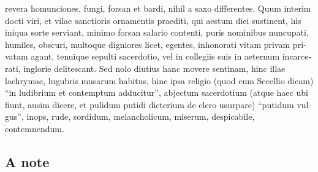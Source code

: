 \begin{latin}
revera homunciones, fungi, forsan et bardi, nihil a saxo differentes. Quum
interim docti viri, et vilae sanctioris ornamentis praediti, qui aestum diei
sustinent, his iniqua sorte serviant, minimo forsan salario contenti, puris
nominibus nuncupati, humiles, obscuri, multoque digniores licet, egentes,
inhonorati vitam privam privatam agant, tenuique sepulti sacerdotio, vel in
collegiis suis in aeternum incarcerati, inglorie delitescant. Sed nolo
diutius hanc movere sentinam, hinc illae lachrymae, lugubris musarum habitus,
hinc ipsa religio (quod cum Secellio dicam) \enquote{in
ludibrium et contemptum adducitur}, abjectum sacerdotium (atque haec ubi
fiunt, ausim dicere, et pulidum putidi dicterium de clero
usurpare) \enquote{putidum vulgus}, inops, rude, sordidum, melancholicum, miserum,
despicabile, contemnendum.
\end{latin}

\subsection{A note}

